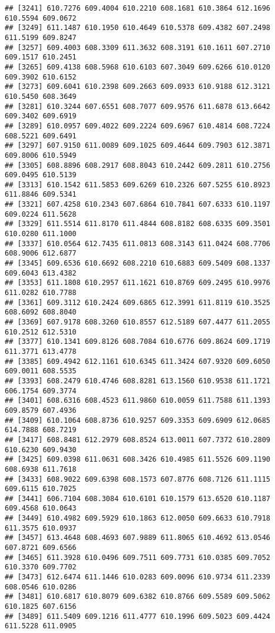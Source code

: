 \documentclass[
]{article}
\begin{document}
\begin{verbatim}
## [3241] 610.7276 609.4004 610.2210 608.1681 610.3864 612.1696 610.5594 609.0672
## [3249] 611.1487 610.1950 610.4649 610.5378 609.4382 607.2498 611.5199 609.8247
## [3257] 609.4003 608.3309 611.3632 608.3191 610.1611 607.2710 609.1517 610.2451
## [3265] 609.4138 608.5968 610.6103 607.3049 609.6266 610.0120 609.3902 610.6152
## [3273] 609.6041 610.2398 609.2663 609.0933 610.9188 612.3121 610.5450 608.3649
## [3281] 610.3244 607.6551 608.7077 609.9576 611.6878 613.6642 609.3402 609.6919
## [3289] 610.0957 609.4022 609.2224 609.6967 610.4814 608.7224 608.5221 609.6491
## [3297] 607.9150 611.0089 609.1025 609.4644 609.7903 612.3871 609.8006 610.5949
## [3305] 608.8896 608.2917 608.8043 610.2442 609.2811 610.2756 609.0495 610.5139
## [3313] 610.1542 611.5853 609.6269 610.2326 607.5255 610.8923 611.8846 609.5341
## [3321] 607.4258 610.2343 607.6864 610.7841 607.6333 610.1197 609.0224 611.5628
## [3329] 611.5514 611.8170 611.4844 608.8182 608.6335 609.3501 610.0280 611.1000
## [3337] 610.0564 612.7435 611.0813 608.3143 611.0424 608.7706 608.9006 612.6877
## [3345] 609.6536 610.6692 608.2210 610.6883 609.5409 608.1337 609.6043 613.4382
## [3353] 611.1808 610.2957 611.1621 610.8769 609.2495 610.9976 611.0282 610.7788
## [3361] 609.3112 610.2424 609.6865 612.3991 611.8119 610.3525 608.6092 608.8040
## [3369] 607.9178 608.3260 610.8557 612.5189 607.4477 611.2055 610.2512 612.5310
## [3377] 610.1341 609.8126 608.7084 610.6776 609.8624 609.1719 611.3771 613.4778
## [3385] 609.4942 612.1161 610.6345 611.3424 607.9320 609.6050 609.0011 608.5535
## [3393] 608.2479 610.4746 608.8281 613.1560 610.9538 611.1721 606.1754 609.3774
## [3401] 608.6316 608.4523 611.9860 610.0059 611.7588 611.1393 609.8579 607.4936
## [3409] 610.1064 608.8736 610.9257 609.3353 609.6909 612.0685 614.7888 608.7219
## [3417] 608.8481 612.2979 608.8524 613.0011 607.7372 610.2809 610.6230 609.9430
## [3425] 609.0398 611.0631 608.3426 610.4985 611.5526 609.1190 608.6938 611.7618
## [3433] 608.9022 609.6398 608.1573 607.8776 608.7126 611.1115 609.6115 610.7025
## [3441] 606.7104 608.3084 610.6101 610.1579 613.6520 610.1187 609.4568 610.0643
## [3449] 610.4982 609.5929 610.1863 612.0050 609.6633 610.7918 611.3575 610.0937
## [3457] 613.4648 608.4693 607.9889 611.8065 610.4692 613.0546 607.8721 609.6566
## [3465] 611.3928 610.0496 609.7511 609.7731 610.0385 609.7052 610.3370 609.7702
## [3473] 612.6474 611.1446 610.0283 609.0096 610.9734 611.2339 608.0546 610.0286
## [3481] 610.6817 610.8079 609.6382 610.8766 609.5589 609.5062 610.1825 607.6156
## [3489] 611.5409 609.1216 611.4777 610.1996 609.5023 609.4424 611.5228 611.0905

\end{verbatim}
\end{document}
